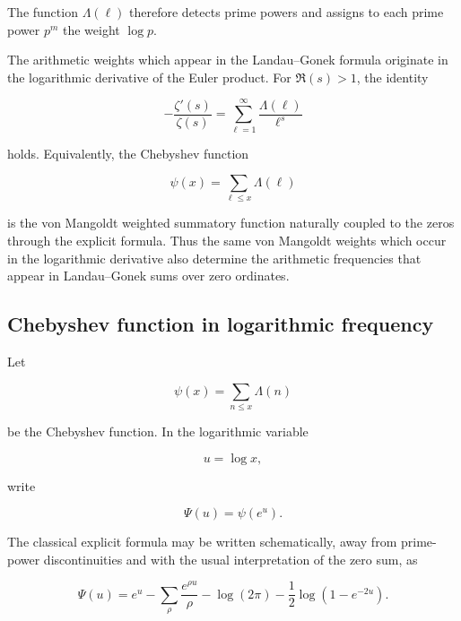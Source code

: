 \documentclass[11pt]{amsart}
\numberwithin{equation}{section}
\theoremstyle{plain}
\theoremstyle{definition}
\theoremstyle{remark}
\begin{document}
The function \(\Lambda(\ell)\) therefore detects prime powers and assigns
to each prime power \(p^m\) the weight \(\log p\).


The arithmetic weights which appear in the Landau--Gonek formula
originate in the logarithmic derivative of the Euler product. For
\(\Re(s)>1\), the identity

\begin{equation}
-\frac{\zeta'(s)}{\zeta(s)}
=
\sum_{\ell=1}^{\infty}
\frac{\Lambda(\ell)}{\ell^s}
\label{eq:log_derivative_von_mangoldt_bridge}
\end{equation}

holds. Equivalently, the Chebyshev function

\begin{equation}
\psi(x)
=
\sum_{\ell\leq x}\Lambda(\ell)
\label{eq:chebyshev_function_von_mangoldt_bridge}
\end{equation}

is the von Mangoldt weighted summatory function naturally coupled to
the zeros through the explicit formula. Thus the same von Mangoldt weights which
occur in the logarithmic derivative also determine the arithmetic
frequencies that appear in Landau--Gonek sums over zero ordinates.

\subsection{Chebyshev function in logarithmic frequency}
\label{subsec:chebyshev_logarithmic_frequency}

Let

\begin{equation}
\psi(x)=\sum_{n\le x}\Lambda(n)
\end{equation}

be the Chebyshev function. In the logarithmic variable

\begin{equation}
u=\log x,
\end{equation}

write

\begin{equation}
\Psi(u)=\psi(e^u).
\end{equation}

The classical explicit formula may be written schematically, away from
prime-power discontinuities and with the usual interpretation of the
zero sum, as

\begin{equation}
\Psi(u)
=
e^u
-
\sum_\rho \frac{e^{\rho u}}{\rho}
-
\log(2\pi)
-
\frac12\log(1-e^{-2u}).
\label{eq:chebyshev_log_frequency_explicit_formula}
\end{equation}
\end{document}
